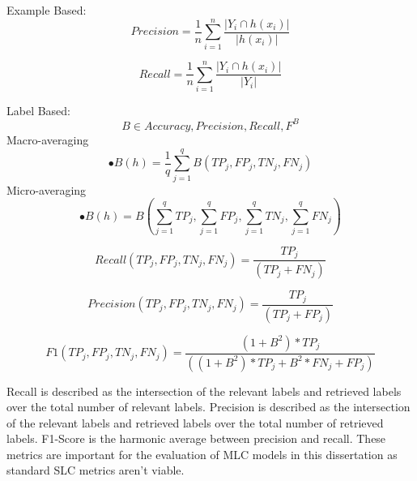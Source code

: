 \documentclass{csfyp}
\begin{document}
Example Based:
\begin{equation}
Precision = \frac{1}{n}\sum_{i=1}^{n}\frac{|Y_{i}\cap h(x_{i})|}{|h(x_{i})|}
\end{equation}

\begin{equation}
Recall = \frac{1}{n}\sum_{i=1}^{n}\frac{|Y_{i}\cap h(x_{i})|}{|Y_{i}|}
\end{equation}

Label Based:
\begin{equation}
B \in { Accuracy, Precision, Recall, F^B} 
\end{equation}
Macro-averaging
\begin{equation}
•B(h) = \frac{1}{q}\sum_{j=1}^{q} B(TP_j,FP_j,TN_j,FN_j)
\end{equation}
Micro-averaging
\begin{equation}
•B(h) = B(\sum_{j=1}^{q} TP_j,\sum_{j=1}^{q} FP_j,\sum_{j=1}^{q} TN_j,\sum_{j=1}^{q} FN_j)
\end{equation}

\begin{equation}
Recall(TP_j,FP_j,TN_j,FN_j) = \frac{TP_j}{(TP_j + FN_j)}
\end{equation}

\begin{equation}
Precision(TP_j,FP_j,TN_j,FN_j) = \frac{TP_j}{(TP_j + FP_j)}
\end{equation}

\begin{equation}
F1(TP_j,FP_j,TN_j,FN_j) = \frac{(1+B^2)*TP_j}{((1+B^2)*TP_j+B^2*FN_j+FP_j)}
\end{equation}


Recall is described as the intersection of the relevant labels and retrieved labels over the total number of relevant labels. Precision is described as the intersection of the relevant labels and retrieved labels over the total number of retrieved labels. F1-Score is the harmonic average between precision and recall. These metrics are important for the evaluation of MLC models in this dissertation as standard SLC metrics aren't viable.
\end{document}
